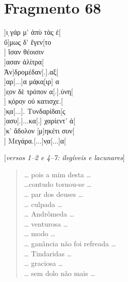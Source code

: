 \pagebreak
\section{Fragmento 68} 

\begin{gkverse}
]ι ̣γάρ μ’ ἀπὺ τὰς ἐ[\\
ὔ]μως δ’ ἔγεν[το\\
   ] ἴσαν θέοισιν\\
 ]ασαν ἀλίτρα[\\
        Ἀν]δρομέδαν[.].αξ[\\
   ]αρ[...]α μά̣κα̣[ιρ] α\\
 ]ε̣ον δὲ τρόπον α[.].ύνη[\\
      ] κ̣όρο̣ν οὐ κατισχε.[\\
]κ̣α[...]. Τυνδαρίδαι[ς\\
]ασυ[.]...κα[.] χαρίεντ’ ἀ[\\
]κ’ ἄδολον [μ]ηκέτι συν[\\
] Μεγάρα.[...]ν̣α[...]α[

\textnormal{[\textit{versos 1--2 e 4--7: ilegíveis e lacunares}]}

\end{gkverse}

\begin{verse}
\ldots{} pois a mim desta \ldots{}\\
\ldots{}contudo tornou-se \ldots{}\\
\ldots{} par dos deuses \ldots{}\\
\ldots{} culpada \ldots{}\\
\ldots{} Andrômeda \ldots{}\\
\ldots{} venturosa \ldots{}\\
\ldots{} modo \ldots{}\\
\ldots{} ganância não foi refreada \ldots{}\\
\ldots{} Tindaridas \ldots{}\\
\ldots{} graciosa \ldots{}\\
\ldots{} sem dolo não mais \ldots{}
\end{verse}

